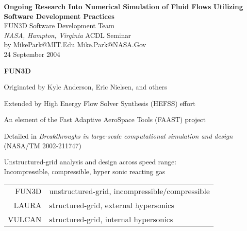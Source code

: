 \documentclass[landscape]{slides}
\renewcommand{\title}[1]{{\large\bfseries #1}}
\begin{document}
\raggedright

  \begin{titlepage}
    \thispagestyle{empty}
     {\bfseries\Large Ongoing Research Into Numerical Simulation 
       of Fluid Flows Utilizing Software Development Practices}\\
     \vfill
	 {\large FUN3D Software Development Team} \\
	 {\itshape NASA, Hampton, Virginia}
	 \vfill
	     {ACDL Seminar\\
	       by MikePark@MIT.Edu Mike.Park@NASA.Gov\\
	       24 September 2004}\\
  \end{titlepage}

  \begin{slide}
    \title{FUN3D}

    Originated by Kyle Anderson, Eric Nielsen, and others

    Extended by High Energy Flow Solver Synthesis (HEFSS) effort

    An element of the Fast Adaptive AeroSpace Tools (FAAST) project

    Detailed in \emph{Breakthroughs in large-scale computational simulation
    and design} {\tiny (NASA/TM 2002-211747)}

    Unstructured-grid analysis and design across speed range:\\
    Incompressible, compressible, hyper sonic reacting gas

    \begin{tabular}{rl}
      FUN3D & unstructured-grid, incompressible/compressible \\
      LAURA & structured-grid, external hypersonics \\
      VULCAN & structured-grid, internal hypersonics 
    \end{tabular}
  \end{slide}
 
\end{document}
